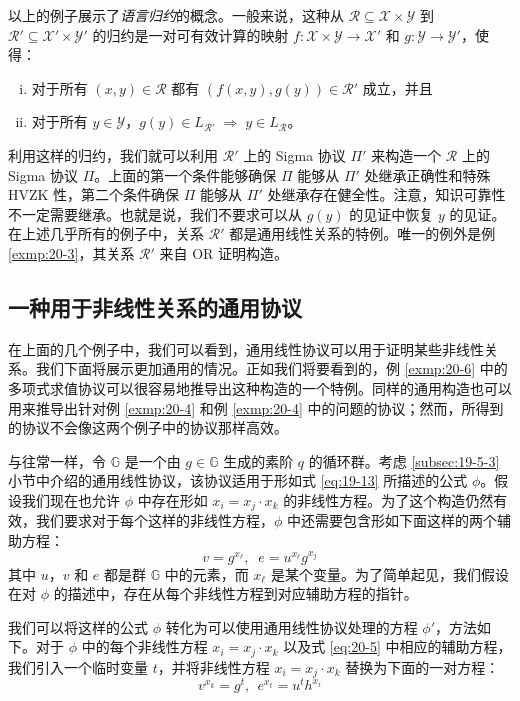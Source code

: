 以上的例子展示了\emph{语言归约}的概念。一般来说，这种从 $\mathcal{R}\subseteq\mathcal{X}\times\mathcal{Y}$ 到 $\mathcal{R}'\subseteq\mathcal{X}'\times\mathcal{Y}'$ 的归约是一对可有效计算的映射 $f:\mathcal{X}\times\mathcal{Y}\to\mathcal{X}'$ 和 $g:\mathcal{Y}\to\mathcal{Y}'$，使得：
\begin{enumerate}[(i)]
	\item 对于所有 $(x,y)\in\mathcal{R}$ 都有 $(f(x,y),g(y))\in\mathcal{R}'$ 成立，并且
	\item 对于所有 $y\in\mathcal{Y}$，$g(y)\in L_{\mathcal{R}'}\; \Longrightarrow\; y\in L_{\mathcal R}$。
\end{enumerate}
利用这样的归约，我们就可以利用 $\mathcal{R}'$ 上的 Sigma 协议 $\Pi'$ 来构造一个 $\mathcal{R}$ 上的 Sigma 协议 $\Pi$。上面的第一个条件能够确保 $\Pi$ 能够从 $\Pi'$ 处继承正确性和特殊 HVZK 性，第二个条件确保 $\Pi$ 能够从 $\Pi'$ 处继承存在健全性。注意，知识可靠性不一定需要继承。也就是说，我们不要求可以从 $g(y)$ 的见证中恢复 $y$ 的见证。在上述几乎所有的例子中，关系 $\mathcal{R}'$ 都是通用线性关系的特例。唯一的例外是例 \ref{exmp:20-3}，其关系 $\mathcal{R}'$ 来自 OR 证明构造。

\subsection{一种用于非线性关系的通用协议}\label{subsec:20-2-1}

在上面的几个例子中，我们可以看到，通用线性协议可以用于证明某些非线性关系。我们下面将展示更加通用的情况。正如我们将要看到的，例 \ref{exmp:20-6} 中的多项式求值协议可以很容易地推导出这种构造的一个特例。同样的通用构造也可以用来推导出针对例 \ref{exmp:20-4} 和例 \ref{exmp:20-4} 中的问题的协议；然而，所得到的协议不会像这两个例子中的协议那样高效。

与往常一样，令 $\mathbb{G}$ 是一个由 $g\in\mathbb{G}$ 生成的素阶 $q$ 的循环群。考虑 \ref{subsec:19-5-3} 小节中介绍的通用线性协议，该协议适用于形如式 \ref{eq:19-13} 所描述的公式 $\phi$。假设我们现在也允许 $\phi$ 中存在形如 $x_i=x_j\cdot x_k$ 的非线性方程。为了这个构造仍然有效，我们要求对于每个这样的非线性方程，$\phi$ 中还需要包含形如下面这样的两个辅助方程：
\begin{equation}\label{eq:20-5}
v=g^{x_\ell},\;\;
e=u^{x_\ell}g^{x_j}
\end{equation}
其中 $u$，$v$ 和 $e$ 都是群 $\mathbb{G}$ 中的元素，而 $x_\ell$ 是某个变量。为了简单起见，我们假设在对 $\phi$ 的描述中，存在从每个非线性方程到对应辅助方程的指针。

我们可以将这样的公式 $\phi$ 转化为可以使用通用线性协议处理的方程 $\phi'$，方法如下。对于 $\phi$ 中的每个非线性方程 $x_i=x_j\cdot x_k$ 以及式 \ref{eq:20-5} 中相应的辅助方程，我们引入一个临时变量 $t$，并将非线性方程 $x_i=x_j\cdot x_k$ 替换为下面的一对方程：
\begin{equation}\label{eq:20-6}
v^{x_k}=g^t,~~
e^{x_t}=u^th^{x_i}
\end{equation}

